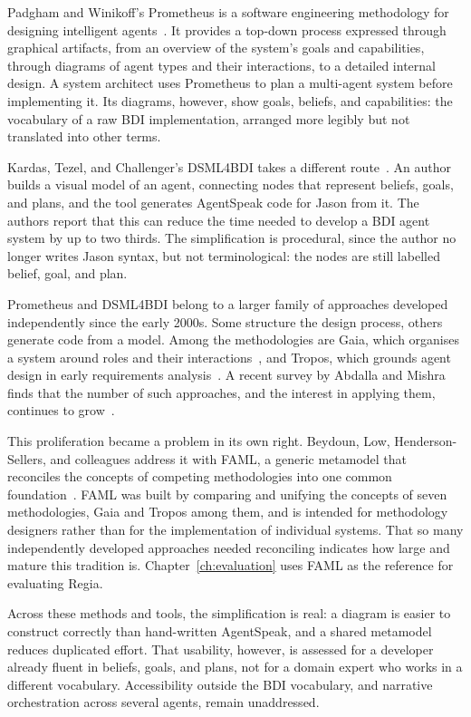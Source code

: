 Padgham and Winikoff's Prometheus is a software engineering methodology for designing intelligent agents~\cite{Padgham2002}. It provides a top-down process expressed through graphical artifacts, from an overview of the system's goals and capabilities, through diagrams of agent types and their interactions, to a detailed internal design. A system architect uses Prometheus to plan a multi-agent system before implementing it. Its diagrams, however, show goals, beliefs, and capabilities: the vocabulary of a raw BDI implementation, arranged more legibly but not translated into other terms.
 
Kardas, Tezel, and Challenger's DSML4BDI takes a different route~\cite{Kardas2018}. An author builds a visual model of an agent, connecting nodes that represent beliefs, goals, and plans, and the tool generates AgentSpeak code for Jason from it. The authors report that this can reduce the time needed to develop a BDI agent system by up to two thirds. The simplification is procedural, since the author no longer writes Jason syntax, but not terminological: the nodes are still labelled belief, goal, and plan.
 
Prometheus and DSML4BDI belong to a larger family of approaches developed independently since the early 2000s. Some structure the design process, others generate code from a model. Among the methodologies are Gaia, which organises a system around roles and their interactions~\cite{Wooldridge2000}, and Tropos, which grounds agent design in early requirements analysis~\cite{Bresciani2004}. A recent survey by Abdalla and Mishra finds that the number of such approaches, and the interest in applying them, continues to grow~\cite{Abdalla2021}.
 
This proliferation became a problem in its own right. Beydoun, Low, Henderson-Sellers, and colleagues address it with FAML, a generic metamodel that reconciles the concepts of competing methodologies into one common foundation~\cite{Beydoun2009}. FAML was built by comparing and unifying the concepts of seven methodologies, Gaia and Tropos among them, and is intended for methodology designers rather than for the implementation of individual systems. That so many independently developed approaches needed reconciling indicates how large and mature this tradition is. Chapter~\ref{ch:evaluation} uses FAML as the reference for evaluating Regia.
 
Across these methods and tools, the simplification is real: a diagram is easier to construct correctly than hand-written AgentSpeak, and a shared metamodel reduces duplicated effort. That usability, however, is assessed for a developer already fluent in beliefs, goals, and plans, not for a domain expert who works in a different vocabulary. Accessibility outside the BDI vocabulary, and narrative orchestration across several agents, remain unaddressed.

